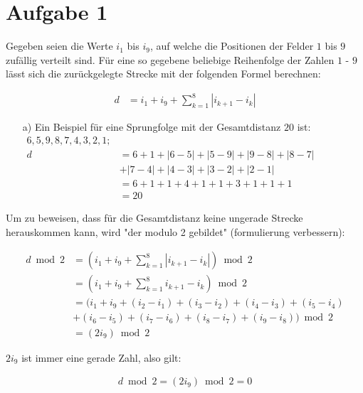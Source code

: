 \documentclass[12pt,a4paper,oneside]{article}
\begin{document}
\pagestyle{fancy}
\fancyfoot[C]{\thepage}

\section[]{Aufgabe 1}

Gegeben seien die Werte $i_1$ bis $i_9$, auf welche die Positionen der Felder $1$ bis $9$ zufällig verteilt sind.
Für eine so gegebene beliebige Reihenfolge der Zahlen $1$ - $9$ lässt sich die zurückgelegte Strecke mit der folgenden Formel berechnen:

\begin{align*}
	d &= i_1 + i_9 + \sum_{k=1}^{8} |i_{k+1} - i_k|
\end{align*}

\begin{itemize}
	\item[a)] Ein Beispiel für eine Sprungfolge mit der Gesamtdistanz $20$ ist: \\
		$\displaystyle\begin{aligned}
		6, 5, 9, 8, 7, 4, 3, 2, 1; \\
			d &= 6 + 1 + |6-5|+|5-9|+|9-8|+|8-7| \\
			&+ |7-4|+|4-3|+|3-2|+|2-1| \\
			&= 6 + 1 + 1 + 4 + 1 + 1 + 3 + 1 + 1 + 1 \\
			&= 20
		\end{aligned}$
\end{itemize}

Um zu beweisen, dass für die Gesamtdistanz keine ungerade Strecke herauskommen kann, wird "der modulo 2 gebildet" (formulierung verbessern):

\begin{align*}
	d \bmod 2 &= \left(i_1 + i_9 + \sum_{k=1}^{8} |i_{k+1} - i_k|\right) \bmod 2 \\
	&= \left(i_1 + i_9 + \sum_{k=1}^{8} i_{k+1} - i_k\right) \bmod 2 \\
	&= \biggl(i_1 + i_9 + (i_2 - i_1) + (i_3 - i_2) + (i_4 - i_3) + (i_5 - i_4) \\
	&+ (i_6 - i_5) + (i_7 - i_6) + (i_8 - i_7) + (i_9 - i_8)\biggr) \bmod 2 \\
	&= (2 i_9) \bmod 2
\end{align*}

$2 i_9$ ist immer eine gerade Zahl, also gilt:

\begin{align*}
	d \bmod 2 = (2 i_9) \bmod 2 = 0
\end{align*}
\end{document}
